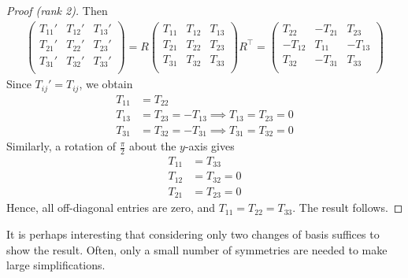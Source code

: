 \documentclass{../../template/note}
\begin{document}
\begin{proof}[Proof (rank 2)]
        Then
        \begin{align*}
            \begin{pmatrix}
                T_{11}' & T_{12}' & T_{13}' \\
                T_{21}' & T_{22}' & T_{23}' \\
                T_{31}' & T_{32}' & T_{33}' \\
            \end{pmatrix} = R \begin{pmatrix}
                T_{11} & T_{12} & T_{13} \\
                T_{21} & T_{22} & T_{23} \\
                T_{31} & T_{32} & T_{33} \\
            \end{pmatrix} R^\intercal = \begin{pmatrix}
                T_{22} & -T_{21} & T_{23} \\
                -T_{12} & T_{11} & -T_{13} \\
                T_{32} & -T_{31} & T_{33} \\
            \end{pmatrix}
        \end{align*}
        Since \(T_{ij}' = T_{ij}\), we obtain
        \begin{align*}
            T_{11} &= T_{22} \\
            T_{13} &= T_{23} = -T_{13} \implies T_{13} = T_{23} = 0 \\
            T_{31} &= T_{32} = -T_{31} \implies T_{31} = T_{32} = 0
        \end{align*}
        Similarly, a rotation of \(\frac \pi 2\) about the \(y\)-axis gives
        \begin{align*}
            T_{11} &= T_{33} \\
            T_{12} &= T_{32} = 0 \\
            T_{21} &= T_{23} = 0
        \end{align*}
        Hence, all off-diagonal entries are zero, and \(T_{11} = T_{22} = T_{33}\). The result follows.
    \end{proof}

    \begin{remark*}
        It is perhaps interesting that considering only two changes of basis suffices to show the result. Often, only a small number of symmetries are needed to make large simplifications.
    \end{remark*}
    
\end{document}
